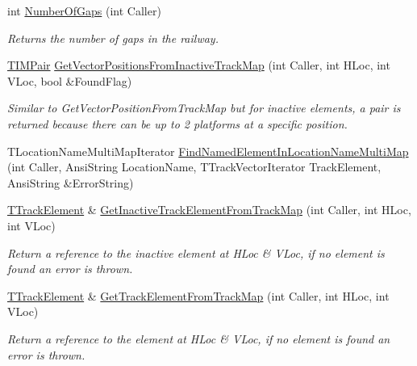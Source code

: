\begin{DoxyCompactItemize}
\mbox{\label{class_t_track_a72c171ba53777dc2f5fab90877f9bc45}} 
int \mbox{\hyperlink{class_t_track_a72c171ba53777dc2f5fab90877f9bc45}{Number\+Of\+Gaps}} (int Caller)
\begin{DoxyCompactList}\small\item\em Returns the number of gaps in the railway. \end{DoxyCompactList}\item 
\mbox{\label{class_t_track_a418966e6fefb71b9d0c9b941197832da}} 
\mbox{\hyperlink{class_t_track_ae0a83809dc6f3dabb0f8fd8e9464ac70}{T\+I\+M\+Pair}} \mbox{\hyperlink{class_t_track_a418966e6fefb71b9d0c9b941197832da}{Get\+Vector\+Positions\+From\+Inactive\+Track\+Map}} (int Caller, int H\+Loc, int V\+Loc, bool \&Found\+Flag)
\begin{DoxyCompactList}\small\item\em Similar to Get\+Vector\+Position\+From\+Track\+Map but for inactive elements, a pair is returned because there can be up to 2 platforms at a specific position. \end{DoxyCompactList}\item 
T\+Location\+Name\+Multi\+Map\+Iterator \mbox{\hyperlink{class_t_track_a694370e3ec67d43da1d8333e06d9ebba}{Find\+Named\+Element\+In\+Location\+Name\+Multi\+Map}} (int Caller, Ansi\+String Location\+Name, T\+Track\+Vector\+Iterator Track\+Element, Ansi\+String \&Error\+String)
\item 
\mbox{\label{class_t_track_a224071baecc50be0a643711bf9005db2}} 
\mbox{\hyperlink{class_t_track_element}{T\+Track\+Element}} \& \mbox{\hyperlink{class_t_track_a224071baecc50be0a643711bf9005db2}{Get\+Inactive\+Track\+Element\+From\+Track\+Map}} (int Caller, int H\+Loc, int V\+Loc)
\begin{DoxyCompactList}\small\item\em Return a reference to the inactive element at H\+Loc \& V\+Loc, if no element is found an error is thrown. \end{DoxyCompactList}\item 
\mbox{\label{class_t_track_aeb60286bc570dbafab64fe6dc06af2e4}} 
\mbox{\hyperlink{class_t_track_element}{T\+Track\+Element}} \& \mbox{\hyperlink{class_t_track_aeb60286bc570dbafab64fe6dc06af2e4}{Get\+Track\+Element\+From\+Track\+Map}} (int Caller, int H\+Loc, int V\+Loc)
\begin{DoxyCompactList}\small\item\em Return a reference to the element at H\+Loc \& V\+Loc, if no element is found an error is thrown. \end{DoxyCompactList}\item 

\end{DoxyCompactItemize}
